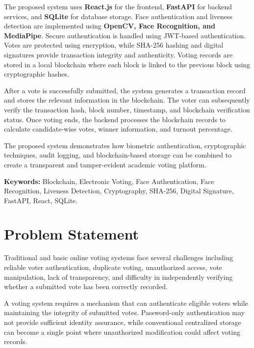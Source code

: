 \documentclass[12pt,a4paper]{report}
\begin{document}
The proposed system uses \textbf{React.js} for the frontend, \textbf{FastAPI} for backend services, and \textbf{SQLite} for database storage. Face authentication and liveness detection are implemented using \textbf{OpenCV, Face Recognition, and MediaPipe}. Secure authentication is handled using JWT-based authentication. Votes are protected using encryption, while SHA-256 hashing and digital signatures provide transaction integrity and authenticity. Voting records are stored in a local blockchain where each block is linked to the previous block using cryptographic hashes.

After a vote is successfully submitted, the system generates a transaction record and stores the relevant information in the blockchain. The voter can subsequently verify the transaction hash, block number, timestamp, and blockchain verification status. Once voting ends, the backend processes the blockchain records to calculate candidate-wise votes, winner information, and turnout percentage.

The proposed system demonstrates how biometric authentication, cryptographic techniques, audit logging, and blockchain-based storage can be combined to create a transparent and tamper-evident academic voting platform.

\vspace{0.15cm}

\textbf{Keywords:}
Blockchain, Electronic Voting, Face Authentication, Face Recognition, Liveness Detection, Cryptography, SHA-256, Digital Signature, FastAPI, React, SQLite.

\newpage


\chapter*{Problem Statement}

Traditional and basic online voting systems face several challenges including reliable voter authentication, duplicate voting, unauthorized access, vote manipulation, lack of transparency, and difficulty in independently verifying whether a submitted vote has been correctly recorded.

A voting system requires a mechanism that can authenticate eligible voters while maintaining the integrity of submitted votes. Password-only authentication may not provide sufficient identity assurance, while conventional centralized storage can become a single point where unauthorized modification could affect voting records.
\end{document}
